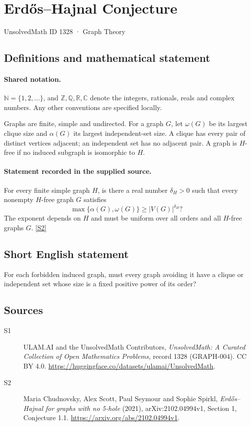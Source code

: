 \documentclass[11pt]{article}
\newcommand{\sref}[2]{\hyperlink{source:#1:#2}{[S#2]}}
\begin{document}
\setcounter{section}{1327}
\section{Erdős–Hajnal Conjecture}\label{1328}
{\small\sffamily UnsolvedMath ID 1328 · Graph Theory}
\subsection{Definitions and mathematical statement}

\paragraph{Shared notation.}$\mathbb N=\{1,2,\ldots\}$, and $\mathbb Z,\mathbb Q,\mathbb R,\mathbb C$ denote the integers, rationals, reals and complex numbers. Any other conventions are specified locally.


Graphs are finite, simple and undirected. For a graph $G$, let $\omega(G)$ be its largest clique size and $\alpha(G)$ its largest independent-set size. A clique has every pair of distinct vertices adjacent; an independent set has no adjacent pair. A graph is $H$-free if no induced subgraph is isomorphic to $H$.
\paragraph{Statement recorded in the supplied source.}
For every finite simple graph $H$, is there a real number $\delta_H>0$ such that every nonempty $H$-free graph $G$ satisfies
\[
 \max\{\alpha(G),\omega(G)\}\ge |V(G)|^{\delta_H}?
\]
The exponent depends on $H$ and must be uniform over all orders and all $H$-free graphs $G$. \sref{1328}{2}
\subsection{Short English statement}
For each forbidden induced graph, must every graph avoiding it have a clique or independent set whose size is a fixed positive power of its order?
\subsection{Sources}
\begin{description}
\item[\hypertarget{source:1328:1}{S1}] ULAM.AI and the UnsolvedMath Contributors, \emph{UnsolvedMath: A Curated Collection of Open Mathematics Problems}, record 1328 (GRAPH-004). CC BY 4.0. \url{https://huggingface.co/datasets/ulamai/UnsolvedMath}.
\item[\hypertarget{source:1328:2}{S2}] Maria Chudnovsky, Alex Scott, Paul Seymour and Sophie Spirkl, \emph{Erdős--Hajnal for graphs with no 5-hole} (2021), arXiv:2102.04994v1, Section 1, Conjecture 1.1. \url{https://arxiv.org/abs/2102.04994v1}.
\end{description}
\label{end:1328}
\end{document}
